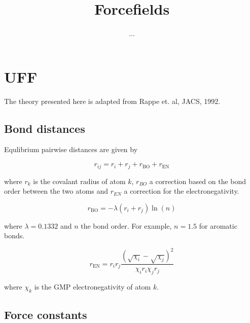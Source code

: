 \documentclass[10pt]{article}
\title{Forcefields}
\author{...}
\begin{document}
\maketitle

\section{UFF}
The theory presented here is adapted from Rappe et. al, JACS, 1992.
\subsection{Bond distances}

Equlibrium pairwise distances are given by

\begin{equation}
    r_{ij} = r_i + r_j + r_\text{BO} + r_\text{EN}
\end{equation}

where $r_k$ is the covalant radius of atom $k$, $r_{BO}$ a correction based on the bond order between the two atoms and $r_{EN}$ a correction for the electronegativity.

\begin{equation}
    r_\text{BO} = -\lambda (r_i + r_j) \ln(n)
\end{equation}

where $\lambda = 0.1332$ and $n$ the bond order. For example, $n=1.5$ for aromatic bonds.

\begin{equation}
    r_\text{EN} = r_i r_j \frac{(\sqrt{\chi_i} - \sqrt{\chi_j})^2}{\chi_i r_i \chi_j r_j}
\end{equation}

where $\chi_k$ is the GMP electronegativity of atom $k$.

\subsection{Force constants}
\end{document}
